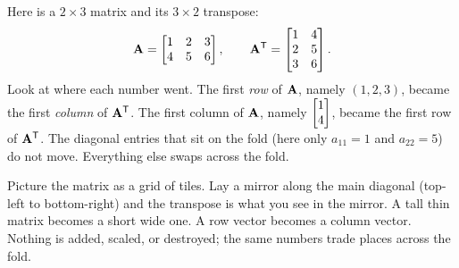 Here is a $2\times 3$ matrix and its $3\times 2$ transpose:
\[
  \mathbf{A} = \begin{bmatrix} 1 & 2 & 3 \\ 4 & 5 & 6 \end{bmatrix},
  \qquad
  \mathbf{A}^{\mathsf{T}} = \begin{bmatrix} 1 & 4 \\ 2 & 5 \\ 3 & 6 \end{bmatrix}.
\]
Look at where each number went. The first \emph{row} of $\mathbf{A}$, namely $(1,2,3)$, became the first
\emph{column} of $\mathbf{A}^{\mathsf{T}}$. The first column of $\mathbf{A}$, namely $\begin{bmatrix}1\\4\end{bmatrix}$, became the first
row of $\mathbf{A}^{\mathsf{T}}$. The diagonal entries that sit on the fold (here only $a_{11}=1$ and $a_{22}=5$)
do not move. Everything else swaps across the fold.

\begin{intuitionbox}
Picture the matrix as a grid of tiles. Lay a mirror along the main diagonal (top-left to
bottom-right) and the transpose is what you see in the mirror. A tall thin matrix becomes a short
wide one. A row vector becomes a column vector. Nothing is added, scaled, or destroyed; the same
numbers trade places across the fold.
\end{intuitionbox}

